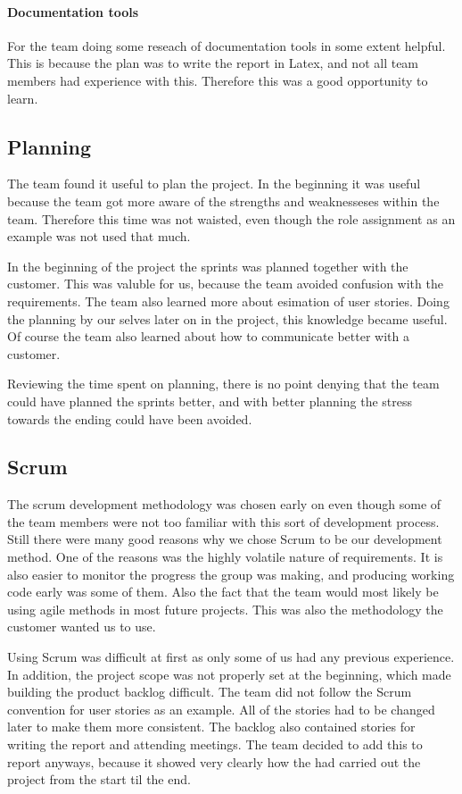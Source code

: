 \paragraph{Documentation tools}
For the team doing some reseach of documentation tools in some extent helpful. This is because the plan was to write the report in Latex, and not all team members had experience with this. Therefore this was a good opportunity to learn.

\subsection{Planning}

The team found it useful to plan the project. In the beginning it was useful because the team got more aware of the strengths and weaknesseses within the team. Therefore this time was not waisted, even though the role assignment as an example was not used that much. 

In the beginning of the project the sprints was planned together with the customer. This was valuble for us, because the team avoided confusion with the requirements. The team also learned more about esimation of user stories. Doing the planning by our selves later on in the project, this knowledge became useful. Of course the team also learned about how to communicate better with a customer. 

Reviewing the time spent on planning, there is no point denying that the team could have planned the sprints better, and with better planning the stress towards the ending could have been avoided.   

\subsection{Scrum}
The scrum development methodology was chosen early on even though some of the team members were not too familiar with this sort of development process.
Still there were many good reasons why we chose Scrum to be our development method.
One of the reasons was the highly volatile nature of requirements.
It is also easier to monitor the progress the group was making, and producing working code early was some of them. Also the fact that the team would most likely be using agile methods in most future projects. 
This was also the methodology the customer wanted us to use. 

Using Scrum was difficult at first as only some of us had any previous experience. 
In addition, the project scope was not properly set at the beginning, which made building the product backlog difficult. 
The team did not follow the Scrum convention for user stories as an example. 
All of the stories had to be changed later to make them more consistent. 
The backlog also contained stories for writing the report and attending meetings.
The team decided to add this to report anyways, because it showed very clearly how the had carried out the project from the start til the end. 

